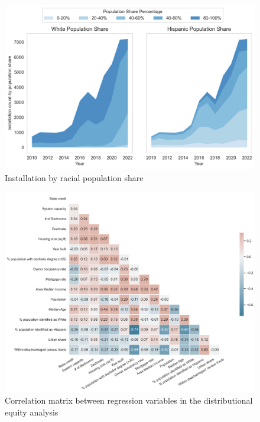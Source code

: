 \documentclass[11pt,twoside,letterpaper]{article}
\begin{document}
\begin{figure}[H]
    \centering
\includegraphics[width=1\textwidth]{figures/population_quintiles.png}
    \caption{Installation by racial population share}
    \label{fig:population_quintiles}
\end{figure}

\begin{figure}[H]
    \centering
\includegraphics[width=1\textwidth]{figures/corr_matrix.png}
    \caption{Correlation matrix between regression variables in the distributional equity analysis}
    \label{fig:corr_matrix}
\end{figure}
\end{document}
